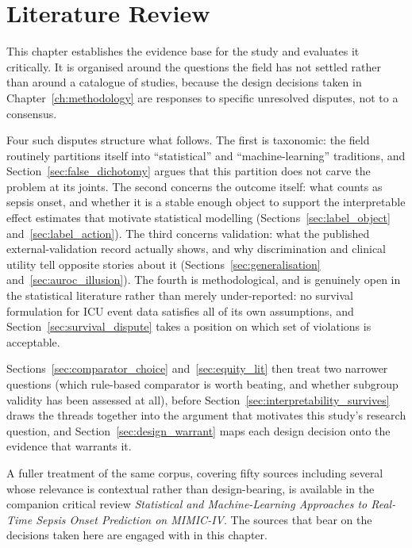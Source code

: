 \chapter{Literature Review}
\label{ch:review}

This chapter establishes the evidence base for the study and evaluates it
critically. It is organised around the questions the field has not settled
rather than around a catalogue of studies, because the design decisions taken
in Chapter~\ref{ch:methodology} are responses to specific unresolved disputes,
not to a consensus.

Four such disputes structure what follows. The first is taxonomic: the field
routinely partitions itself into ``statistical'' and ``machine-learning''
traditions, and Section~\ref{sec:false_dichotomy} argues that this partition
does not carve the problem at its joints. The second concerns the outcome
itself: what counts as sepsis onset, and whether it is a stable enough
object to support the interpretable effect estimates that motivate statistical
modelling (Sections~\ref{sec:label_object} and~\ref{sec:label_action}). The
third concerns validation: what the published external-validation record
actually shows, and why discrimination and clinical utility tell opposite
stories about it (Sections~\ref{sec:generalisation}
and~\ref{sec:auroc_illusion}). The fourth is methodological, and is genuinely
open in the statistical literature rather than merely under-reported: no
survival formulation for ICU event data satisfies all of its own assumptions,
and Section~\ref{sec:survival_dispute} takes a position on which set of
violations is acceptable.

Sections~\ref{sec:comparator_choice} and~\ref{sec:equity_lit} then treat two
narrower questions (which rule-based comparator is worth beating, and
whether subgroup validity has been assessed at all), before
Section~\ref{sec:interpretability_survives} draws the threads together into the
argument that motivates this study's research question, and
Section~\ref{sec:design_warrant} maps each design decision onto the evidence
that warrants it.

A fuller treatment of the same corpus, covering fifty sources including several
whose relevance is contextual rather than design-bearing, is available in the
companion critical review \textit{Statistical and Machine-Learning Approaches
to Real-Time Sepsis Onset Prediction on MIMIC-IV}. The sources that bear on the
decisions taken here are engaged with in this chapter.


